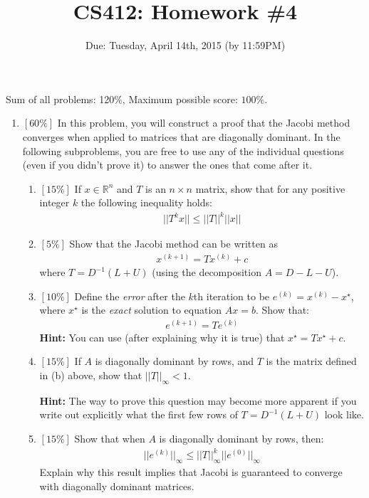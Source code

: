 \documentclass{article}
\author{}
\title{CS412: Homework \#4}
\author{Due: Tuesday, April 14th, 2015 (by 11:59PM)}
\date{}
\begin{document}
\maketitle

\noindent Sum of all problems: 120$\%$, Maximum possible score: $100\%$.
\vspace{.2in}

\begin{enumerate}
\item $[60\%]$ In this problem, you will construct a proof that the Jacobi
method converges when applied to matrices that are diagonally dominant. In the
following subproblems, you are free to use any of the individual questions (even
if you didn't prove it) to answer the ones that come after it.
\begin{enumerate}
\item $[15\%]$ If $x\in\mathbb R^n$ and $T$ is an $n\times n$ matrix, show that
for any positive integer $k$ the following inequality holds:
\begin{eqnarray*}
||T^kx||\leq ||T||^k||x||
\end{eqnarray*}
\item $[5\%]$ Show that the Jacobi method can be written as
\begin{eqnarray*}
x^{(k+1)}=Tx^{(k)}+c
\end{eqnarray*}
where $T=D^{-1}(L+U)$ (using the decomposition $A=D-L-U$).
\item $[10\%]$ Define the \emph{error} after the $k$th iteration to be
$e^{(k)}=x^{(k)}-x^\star$, where $x^\star$ is the \emph{exact} solution to
equation $Ax=b$. Show that:
\begin{eqnarray*}
e^{(k+1)}=Te^{(k)}
\end{eqnarray*}
\textbf{Hint:} You can use (after explaining why it is true) that
$x^\star=Tx^\star+c$.
\item $[15\%]$ If $A$ is diagonally dominant by rows, and $T$ is the matrix
defined in (b) above, show that $||T||_\infty<1$.

\noindent \textbf{Hint:} The way to prove this question may become more apparent
if you write out explicitly what the first few rows of $T=D^{-1}(L+U)$ look
like.
\item $[15\%]$ Show that when $A$ is diagonally dominant by rows, then:
\begin{eqnarray*}
||e^{(k)}||_\infty\leq ||T||^k_\infty||e^{(0)}||_\infty
\end{eqnarray*}
Explain why this result implies that Jacobi is guaranteed to converge with
diagonally dominant matrices.
\end{enumerate}


\end{enumerate}
\end{document}
